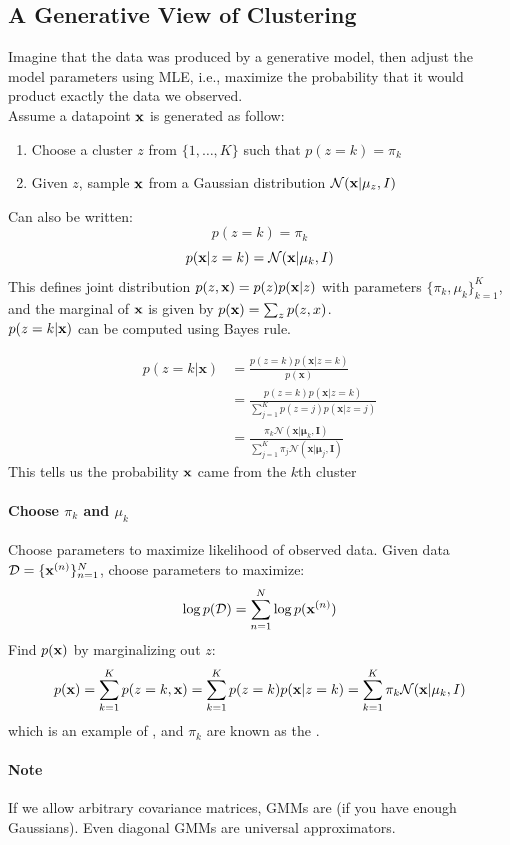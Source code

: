 \documentclass[11pt]{article}
\begin{document}
\subsection{A Generative View of Clustering}
Imagine that the data was produced by a generative model, then adjust the model parameters using MLE, i.e., maximize the probability that it would product exactly the data we observed. \\
Assume a datapoint $\textbf{x}$ is generated as follow:
\begin{enumerate}
	\item Choose a cluster $z$ from $\{1,\hdots, K\}$ such that $p(z=k) = \pi_k$
	\item Given $z$, sample $\textbf{x}$ from a Gaussian distribution $\mathcal{N}(\textbf{x}|\mu_z, I)$
\end{enumerate}
Can also be written:
$$p(z=k) = \pi_k$$
$$p(\textbf{x}|z=k) = \mathcal{N}(\textbf{x}|\mu_k, I)$$
This defines joint distribution $p(z, \textbf{x}) = p(z)p(\textbf{x}|z)$ with parameters $\{\pi_k, \mu_k\}_{k=1}^K$, and the marginal of $\textbf{x}$ is given by $p(\textbf{x}) = \sum_z p(z,x)$. \\
$p(z = k | \textbf{x})$ can be computed using Bayes rule.

\begin{align} p(z=k | \mathbf{x}) &=\frac{p(z=k) p(\mathbf{x} | z=k)}{p(\mathbf{x})} \\ &=\frac{p(z=k) p(\mathbf{x} | z=k)}{\sum_{j=1}^{K} p(z=j) p(\mathbf{x} | z=j)} \\ &=\frac{\pi_{k} \mathcal{N}\left(\mathbf{x} | \boldsymbol{\mu}_{k}, \mathbf{I}\right)}{\sum_{j=1}^{K} \pi_{j} \mathcal{N}\left(\mathbf{x} | \boldsymbol{\mu}_{j}, \mathbf{I}\right)} \end{align}
This tells us the probability $\textbf{x}$ came from the $k$th cluster

\paragraph{Choose $\pi_k$ and $\mu_k$}
Choose parameters to maximize likelihood of observed data. Given data $\mathcal{D} = \{\textbf{x}^{(n)}\}_{n=1}^N$, choose parameters to maximize:
$$\log p(\mathcal{D}) = \sum_{n=1}^N \log p(\textbf{x}^{(n)})$$
Find $p(\textbf{x})$ by marginalizing out $z$:
$$p(\textbf{x}) = \sum_{k=1}^Kp(z=k, \textbf{x}) = \sum_{k=1}^Kp(z=k)p(\textbf{x}|z=k) = \sum_{k=1}^K\pi_k\mathcal{N}(\textbf{x}|\mu_k, I)$$
which is an example of , and $\pi_k$ are known as the .
\paragraph{Note}
If we allow arbitrary covariance matrices, GMMs are  (if you have enough Gaussians). Even diagonal GMMs are universal approximators.
\end{document}
